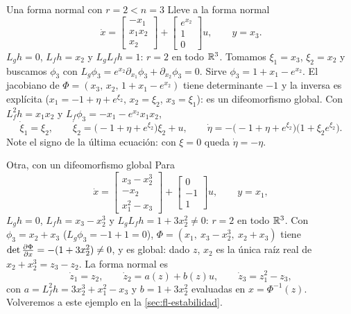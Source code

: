 
\begin{ejemplo}[label=ej:fl-formaexp]{Una forma normal con $r=2<n=3$ \citep{Isi95}}
Lleve a la forma normal
\[
  \dot x=\begin{bmatrix}-x_1\\ x_1x_2\\ x_2\end{bmatrix}+\begin{bmatrix}e^{x_2}\\ 1\\ 0\end{bmatrix}u,\qquad y=x_3 .
\]
\solucion $L_gh=0$, $L_fh=x_2$ y $L_gL_fh=1$: $r=2$ en todo $\mathbb{R}^3$. Tomamos $\xi_1=x_3$, $\xi_2=x_2$ y buscamos $\phi_3$ con $L_g\phi_3=e^{x_2}\partial_{x_1}\phi_3+\partial_{x_2}\phi_3=0$. Sirve $\phi_3=1+x_1-e^{x_2}$. El jacobiano de $\Phi=(x_3,\,x_2,\,1+x_1-e^{x_2})$ tiene determinante $-1$ y la inversa es explícita ($x_1=-1+\eta+e^{\xi_2}$, $x_2=\xi_2$, $x_3=\xi_1$): es un difeomorfismo global. Con $L_f^2h=x_1x_2$ y $L_f\phi_3=-x_1-e^{x_2}x_1x_2$,
\[
  \dot\xi_1=\xi_2,\qquad
  \dot\xi_2=\bigl(-1+\eta+e^{\xi_2}\bigr)\xi_2+u,\qquad
  \dot\eta=-\bigl(-1+\eta+e^{\xi_2}\bigr)\bigl(1+\xi_2e^{\xi_2}\bigr) .
\]
Note el signo de la última ecuación: con $\xi=0$ queda $\dot\eta=-\eta$.
\end{ejemplo}

\begin{ejemplo}[label=ej:fl-formakhalil]{Otra, con un difeomorfismo global}
Para
\begin{equation}
  \dot x=\begin{bmatrix}x_3-x_2^3\\ -x_2\\ x_1^2-x_3\end{bmatrix}+\begin{bmatrix}0\\-1\\1\end{bmatrix}u,\qquad y=x_1,
  \label{eq:fl-ejkhalil}
\end{equation}
$L_gh=0$, $L_fh=x_3-x_2^3$ y $L_gL_fh=1+3x_2^2\neq0$: $r=2$ en todo $\mathbb{R}^3$. Con $\phi_3=x_2+x_3$ ($L_g\phi_3=-1+1=0$), $\Phi=(x_1,\ x_3-x_2^3,\ x_2+x_3)$ tiene $\det\frac{\partial \Phi}{\partial x}=-(1+3x_2^2)\neq0$, y es global: dado $z$, $x_2$ es la única raíz real de $x_2+x_2^3=z_3-z_2$. La forma normal es
\[
  \dot z_1=z_2,\qquad \dot z_2=a(z)+b(z)u,\qquad \dot z_3=z_1^2-z_3,
\]
con $a=L_f^2h=3x_2^3+x_1^2-x_3$ y $b=1+3x_2^2$ evaluadas en $x=\Phi^{-1}(z)$. Volveremos a este ejemplo en la \cref{sec:fl-estabilidad}.
\end{ejemplo}


